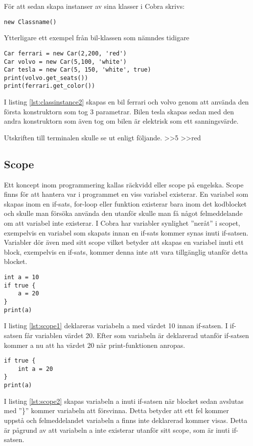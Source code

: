 \documentclass{TDP003mall}
\begin{document}
För att sedan skapa instanser av sina klasser i Cobra skrivs:
\begin{lstlisting}[caption=Klass-instans-exempel, label=lst:classinstance1]
new Classname()
\end{lstlisting}
Ytterligare ett exempel från bil-klassen som nämndes tidigare
\begin{lstlisting}[caption=Klass-instans-exempel 2, label=lst:classinstance2]
Car ferrari = new Car(2,200, 'red')
Car volvo = new Car(5,100, 'white')
Car tesla = new Car(5, 150, 'white', true)
print(volvo.get_seats())
print(ferrari.get_color())
\end{lstlisting}
I listing \ref{lst:classinstance2} skapas en bil ferrari och volvo genom att använda den första konstruktorn som tog 3 parametrar.
Bilen tesla skapas sedan med den andra konstruktorn som även tog om bilen är elektrisk som ett sanningsvärde.

Utskriften till terminalen skulle se ut enligt följande.
>>5
>>red

\newpage
\subsection{Scope}
Ett koncept inom programmering kallas räckvidd eller scope på engelska. Scope finns för att hantera var i programmet en viss variabel existerar. En variabel som skapas inom en if-sats, for-loop eller funktion existerar bara inom det kodblocket och skulle man försöka använda den utanför skulle man få något felmeddelande om att variabel inte existerar. I Cobra har variabler synlighet ''neråt'' i scopet, exempelvis en variabel som skapats innan en if-sats kommer synas inuti if-satsen. Variabler dör även med sitt scope vilket betyder att skapas en variabel inuti ett block, exempelvis en if-sats, kommer denna inte att vara tillgänglig utanför detta blocket.
\begin{lstlisting}[caption=Scope-exempel, label=lst:scope1]
int a = 10
if true {
    a = 20
}
print(a)
\end{lstlisting}
I listing \ref{lst:scope1} deklareras variabeln a med värdet 10 innan if-satsen.
I if-satsen får variablen värdet 20.
Efter som variabeln är deklarerad utanför if-satsen kommer a nu att ha värdet 20 när print-funktionen anropas.

\begin{lstlisting}[caption=Scope-exempel 2, label=lst:scope2]
if true {
    int a = 20
}
print(a)
\end{lstlisting}
I listing \ref{lst:scope2} skapas variabeln a inuti if-satsen när blocket sedan avslutas med ''\}'' kommer variabeln att försvinna.
Detta betyder att ett fel kommer uppstå och felmeddelandet variabeln a finns inte deklarerad kommer visas.
Detta är pågrund av att variabeln a inte existerar utanför sitt scope, som är inuti if-satsen.
\end{document}
